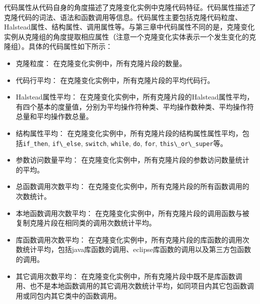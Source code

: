代码属性从代码自身的角度描述了克隆变化实例中克隆代码特征。代码属性描述了克隆代码的词法、语法和函数调用等信息。代码属性主要包括克隆代码粒度、Halstead属性、结构属性、调用属性等。与第三章中代码属性不同的是，克隆变化实例从克隆组的角度提取相应属性（注意一个克隆变化实体表示一个发生变化的克隆组）。具体的代码属性如下所示：
\begin{itemize}
\item 
克隆粒度：
在克隆变化实例中，所有克隆片段的数量。
\item 
代码行平均：
在克隆变化实例中，所有克隆片段的平均代码行。
\item 
Halstead属性平均：
在克隆变化实例中，所有克隆片段的Halstead属性平均，有四个基本的度量值，分别为平均操作符种类、平均操作数种类、平均操作符总量和平均操作数总量。
\item
结构属性平均：
在克隆变化实例中，所有克隆片段的结构属性属性平均，包括\verb+if_then+, \verb+if\_else+, \verb+switch+, \verb+while+, \verb+do+, \verb+for+,  \verb+this\_or\_super+等。 
\item 
参数访问数量平均：
在克隆变化实例中，所有克隆片段的参数访问数量统计的平均。
\item  
总函数调用次数平均：
在克隆变化实例中，所有克隆片段的所有函数调用的次数统计。
\item  
本地函数调用次数平均：
在克隆变化实例中，所有克隆片段的调用函数与被复制克隆片段在相同类的调用次数统计平均。
\item  
库函数调用次数平均：
在克隆变化实例中，所有克隆片段的库函数的调用次数统计平均，包括java库函数的调用、eclipse库函数的调用以及第三方包函数的调用。
\item  
其它调用次数平均：
在克隆变化实例中，所有克隆片段中既不是库函数调用、也不是本地函数调用的其它调用次数统计平均，如同项目内其它包函数调用或同包内其它类中的函数调用。
\end{itemize}


